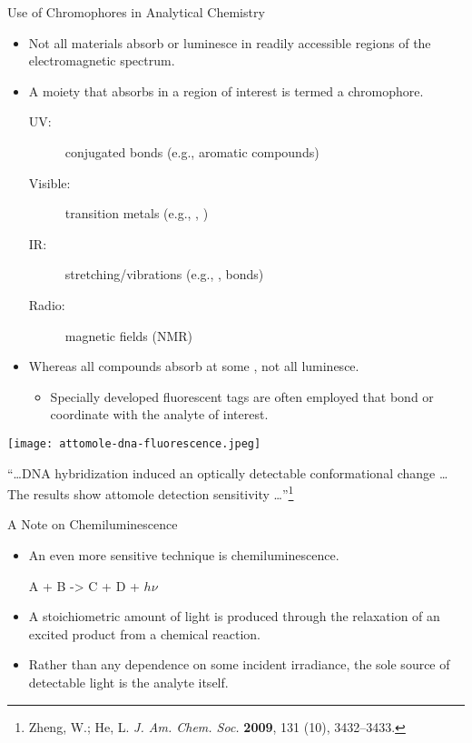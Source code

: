 \documentclass[notes=only]{beamer}
\begin{document}
\begin{frame}[allowframebreaks]{Use of Chromophores in Analytical Chemistry}
	\begin{itemize}
		\item Not all materials absorb or luminesce in readily
			accessible regions of the electromagnetic spectrum.
		\item A \alert{moiety} that absorbs in a region of interest is
			termed a \alert{chromophore}.
			\begin{description}
				\item[UV:] conjugated \textpi{} bonds (e.g., aromatic
				compounds)
			\item[Visible:] transition metals (e.g., ,
				)
			\item[IR:] stretching/vibrations (e.g., ,
				 \textsigma{} bonds)
			\item[Radio:] magnetic fields (NMR)
			\end{description}
		\item Whereas all compounds absorb at some \textlambda, not all
			luminesce.
			\begin{itemize}
				\item Specially developed \alert{fluorescent
					tags} are often employed that bond or
					coordinate with the analyte of interest.
			\end{itemize}
	\end{itemize}

	\framebreak

	\begin{center}
		\texttt{[image: attomole-dna-fluorescence.jpeg]}
	\end{center}

	{\footnotesize
	``\ldots DNA hybridization induced an optically detectable
	conformational change \ldots %
	The results show \alert{attomole detection
	sensitivity} \ldots''\footnote{Zheng, W.; He, L. \textit{J. Am. Chem.
	Soc.} \textbf{2009}, 131 (10), 3432–3433.}}
\end{frame}


\begin{frame}{A Note on Chemiluminescence}
	\begin{itemize}
		\item An even more sensitive technique is
			\alert{chemiluminescence}.

			\begin{reaction*}
				A + B -> C + D + $h\nu$
			\end{reaction*}

		\item A \alert{stoichiometric} amount of light is produced
			through the relaxation of an excited product from a
			chemical reaction.
		\item Rather than any dependence on some incident irradiance,
			the sole source of detectable light is the analyte
			itself.
	\end{itemize}
\end{frame}
\end{document}
